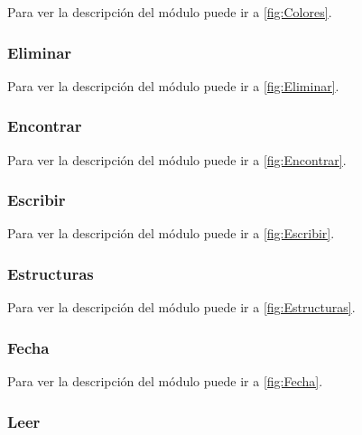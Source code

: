 Para ver la descripción del módulo puede ir a \ref{fig:Colores}.

\label{fig:ColoresCod}


\subsubsection{Eliminar}

Para ver la descripción del módulo puede ir a \ref{fig:Eliminar}.

\label{fig:EliminarCod}


\subsubsection{Encontrar}

Para ver la descripción del módulo puede ir a \ref{fig:Encontrar}.

\label{fig:EncontrarCod}


\subsubsection{Escribir}

Para ver la descripción del módulo puede ir a \ref{fig:Escribir}.

\label{fig:EscribirCod}


\subsubsection{Estructuras}

Para ver la descripción del módulo puede ir a \ref{fig:Estructuras}.

\label{fig:EstructurasCod}


\subsubsection{Fecha}

Para ver la descripción del módulo puede ir a \ref{fig:Fecha}.

\label{fig:FechaCod}


\subsubsection{Leer}

